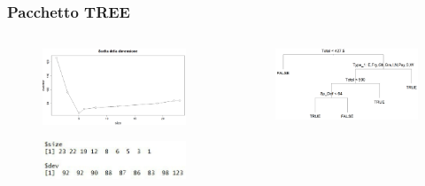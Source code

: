	\begin{frame}
	\frametitle{Pacchetto TREE}
		\begin{center}
			\begin{figure}
				
			\end{figure}
			\begin{columns}
				\begin{column}{0.5\textwidth}
					\begin{center}
						\begin{figure}
							\includegraphics[width=\columnwidth]{img/cvdevtree}
						\end{figure}
						\begin{figure}
							\includegraphics[width=\columnwidth]{img/cverrortree}
						\end{figure}
					\end{center}				
				\end{column}
				\begin{column}{0.5\textwidth}
					\begin{figure}
						\includegraphics[width=\columnwidth]{img/treeEntrpr}
					\end{figure}
				\end{column}
			\end{columns}		
		\end{center}
	\end{frame}


